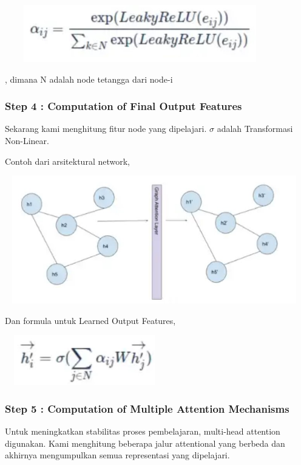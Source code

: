 \documentclass{article}
\begin{document}
\begin{center}
\includegraphics[width=4.63542in,height=0.97917in]{Picture/Fig5.jpg}
\end{center}

, dimana N adalah node tetangga dari node-i

\subsubsection{Step 4 : Computation of Final Output Features
}
Sekarang kami menghitung fitur node yang dipelajari. $\sigma$ adalah Transformasi Non-Linear.


Contoh dari arsitektural network,

\begin{center}
    \includegraphics[width=5.11979in,height=2.18552in]{Picture/Fig6.jpg}
\end{center}

Dan formula untuk Learned Output Features,

\begin{center}
\includegraphics[width=2.72917in,height=0.85417in]{Picture/Fig7.jpg}
\end{center}

\subsubsection{Step 5 : Computation of Multiple Attention Mechanisms}
Untuk meningkatkan stabilitas proses pembelajaran, multi-head  attention digunakan. Kami menghitung beberapa jalur attentional yang berbeda dan akhirnya mengumpulkan semua representasi yang dipelajari.
\end{document}
